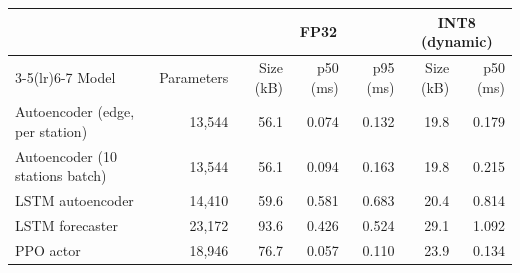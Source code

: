 \begin{tabular}{@{}lrrrrrr@{}}
\toprule
 & & \multicolumn{3}{c}{FP32} & \multicolumn{2}{c}{INT8 (dynamic)} \\
\cmidrule(lr){3-5}\cmidrule(lr){6-7}
Model & Parameters & Size (kB) & p50 (ms) & p95 (ms) & Size (kB) & p50 (ms) \\
\midrule
Autoencoder (edge, per station) & 13,544 & 56.1 & 0.074 & 0.132 & 19.8 & 0.179 \\
Autoencoder (10 stations batch) & 13,544 & 56.1 & 0.094 & 0.163 & 19.8 & 0.215 \\
LSTM autoencoder & 14,410 & 59.6 & 0.581 & 0.683 & 20.4 & 0.814 \\
LSTM forecaster & 23,172 & 93.6 & 0.426 & 0.524 & 29.1 & 1.092 \\
PPO actor & 18,946 & 76.7 & 0.057 & 0.110 & 23.9 & 0.134 \\
\bottomrule
\end{tabular}